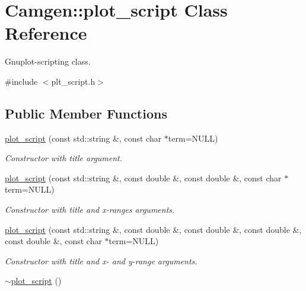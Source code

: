 \hypertarget{a00431}{}\section{Camgen\+:\+:plot\+\_\+script Class Reference}
\label{a00431}


Gnuplot-\/scripting class.  




{\ttfamily \#include $<$plt\+\_\+script.\+h$>$}

\subsection*{Public Member Functions}
\begin{DoxyCompactItemize}
\item 
\hypertarget{a00431_a3321bcc881f0b6d2994d17a2bf9d605c}{}\hyperlink{a00431_a3321bcc881f0b6d2994d17a2bf9d605c}{plot\+\_\+script} (const std\+::string \&, const char $\ast$term=N\+U\+L\+L)\label{a00431_a3321bcc881f0b6d2994d17a2bf9d605c}

\begin{DoxyCompactList}\small\item\em Constructor with title argument. \end{DoxyCompactList}\item 
\hypertarget{a00431_aac537107f92eddbf96140a66fc624515}{}\hyperlink{a00431_aac537107f92eddbf96140a66fc624515}{plot\+\_\+script} (const std\+::string \&, const double \&, const double \&, const char $\ast$term=N\+U\+L\+L)\label{a00431_aac537107f92eddbf96140a66fc624515}

\begin{DoxyCompactList}\small\item\em Constructor with title and x-\/ranges arguments. \end{DoxyCompactList}\item 
\hypertarget{a00431_a9f13d5b3f88ca653b0b48ee81f03fc4a}{}\hyperlink{a00431_a9f13d5b3f88ca653b0b48ee81f03fc4a}{plot\+\_\+script} (const std\+::string \&, const double \&, const double \&, const double \&, const double \&, const char $\ast$term=N\+U\+L\+L)\label{a00431_a9f13d5b3f88ca653b0b48ee81f03fc4a}

\begin{DoxyCompactList}\small\item\em Constructor with title and x-\/ and y-\/range arguments. \end{DoxyCompactList}\item 
\hypertarget{a00431_a78bf6ba995102d763fe4ee10cd1617e0}{}\hyperlink{a00431_a78bf6ba995102d763fe4ee10cd1617e0}{$\sim$plot\+\_\+script} ()\label{a00431_a78bf6ba995102d763fe4ee10cd1617e0}


\end{DoxyCompactItemize}
